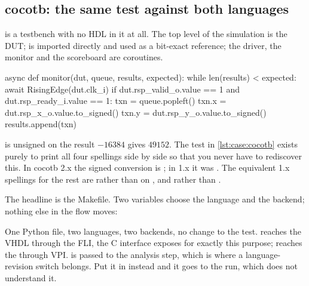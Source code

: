 \subsection{cocotb: the same test against both languages}

 is a testbench with no HDL in it at all. The top level
of the simulation is the DUT;  is imported directly and
used as a bit-exact reference; the driver, the monitor and the scoreboard are
coroutines.

\begin{pycode}
async def monitor(dut, queue, results, expected):
    while len(results) < expected:
        await RisingEdge(dut.clk_i)
        if dut.rsp_valid_o.value == 1 and dut.rsp_ready_i.value == 1:
            txn = queue.popleft()
            txn.x = dut.rsp_x_o.value.to_signed()
            txn.y = dut.rsp_y_o.value.to_signed()
            results.append(txn)
\end{pycode}

\begin{gotcha}{ is unsigned}
 on the result $-16384$ gives $49152$. The
test  in \cref{lst:case:cocotb} exists purely to
print all four spellings side by side so that you never have to rediscover
this. In cocotb 2.x the signed conversion is ; in 1.x it
was . The equivalent 1.x spellings for the rest are
 rather than  on , and 
rather than .
\end{gotcha}

The headline is the Makefile. Two variables choose the language and the
backend; nothing else in the flow moves:


One Python file, two languages, two backends, no change to the test.
 reaches the VHDL through the FLI, the C interface
 exposes for exactly this purpose; 
reaches the \SV{} through VPI.  is passed to the analysis
step, which is where a language-revision switch belongs. Put it in
 instead and it goes to the run, which does not understand it.

